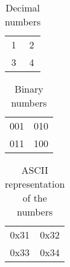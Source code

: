 \documentclass{article}
\begin{document}
\begin{table}
	\centering
	\begin{tabular}{c c}
		1 & 2 \\
		3 & 4
	\end{tabular}
	\caption{Decimal numbers}
\end{table}

\begin{table}
	\centering
	\begin{tabular}{c c}
		001 & 010 \\
		011 & 100
	\end{tabular}
	\caption{Binary numbers}
\end{table}

\begin{table}
	\centering
	\begin{tabular}{c c}
		0x31 & 0x32 \\
		0x33 & 0x34
	\end{tabular}
	\caption*{ASCII representation of the numbers}
\end{table}

\clearpage

\listoftables
\end{document}
